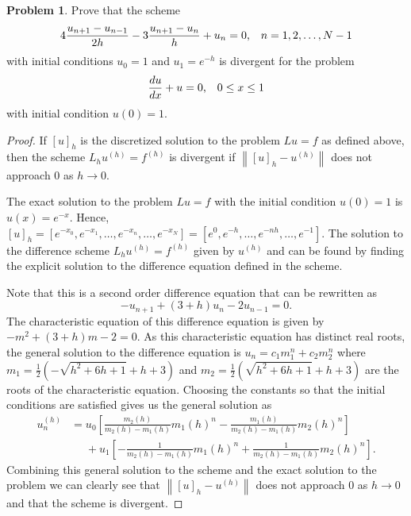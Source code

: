 \documentclass[12pt]{article}
\theoremstyle{definition}
\newtheorem{problem}{Problem}
\newcommand\norm[1]{\left\lVert#1\right\rVert}
\begin{document}
\begin{problem}
  Prove that the scheme
  \[
    4 \frac{u_{n+1} - u_{n-1}}{2h} - 3 \frac{u_{n+1} - u_n}{h} + u_n = 0\text{,\quad $n = 1, 2, \dots, N-1$}
  \]
  with initial conditions $u_0 = 1$ and $u_1 = e^{-h}$ is divergent for the problem
  \[
    \frac{du}{dx} + u = 0\text{,\quad $0 \leq x \leq 1$}
  \]
  with initial condition $u(0) = 1$.
\end{problem}

\begin{proof}
  If $[u]_h$ is the discretized solution to the problem $Lu = f$ as defined above,
  then the scheme $L_h u^{(h)} = f^{(h)}$ is divergent if $\norm{[u]_h - u^{(h)}}$
  does not approach 0 as $h \to 0$.

  The exact solution to the problem $Lu = f$ with the initial condition
  $u(0) = 1$ is $u(x) = e^{-x}$. Hence, $[u]_h = [e^{-x_0}, e^{-x_1}, \dots, e^{-x_n},\dots, e^{-x_N}] = [e^{0}, e^{-h}, \dots, e^{-nh},\dots, e^{-1}]$.
  The solution to the difference scheme $L_h u^{(h)} = f^{(h)}$ given by
  $u^{(h)}$ and can be found by finding the explicit solution to the difference
  equation defined in the scheme.

  Note that this is a second order difference equation that can be rewritten as
  \[
    - u_{n+1} + (3 + h) u_n - 2 u_{n-1} = 0.
  \]
  The characteristic equation of this difference equation is given by $-m^2 + (3+h)m -2 = 0$.
  As this characteristic equation has distinct real roots, the general
  solution to the difference equation is $u_n = c_1 m_1^n + c_2 m_2 ^n$ where
  $m_1 = \frac{1}{2}(-\sqrt{h^2 + 6h +1} + h + 3)$ and $m_2=\frac{1}{2}(\sqrt{h^2 + 6h +1} + h + 3)$
  are the roots of the characteristic equation. Choosing the constants so that
  the initial conditions are satisfied gives us the general solution as
  \begin{align*}
    u_n^{(h)} &= u_0 \left[\frac{m_2(h)}{m_2(h) - m_1(h)}m_1(h)^n - \frac{m_1(h)}{m_2(h) - m_1(h)}m_2(h)^n\right] \\
    &\phantom{= }+ u_1\left[-\frac{1}{m_2(h) - m_1(h)}m_1(h)^n + \frac{1}{m_2(h) - m_1(h)}m_2(h)^n\right].
  \end{align*}
  Combining this general solution to the scheme and the exact solution to the
  problem we can clearly see that $\norm{[u]_h - u^{(h)}}$ does not approach 0 as
  $h\to 0$ and that the scheme is divergent.
\end{proof}
\end{document}
